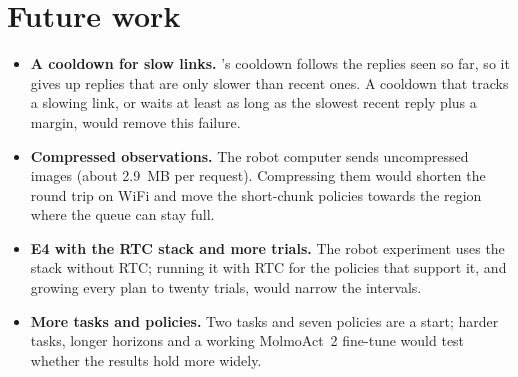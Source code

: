 \section{Future work}
\begin{itemize}
\item \textbf{A cooldown for slow links.} \drtc's cooldown follows the replies seen so far, so it gives up replies that
      are only slower than recent ones. A cooldown that tracks a slowing link, or waits at least as long as the slowest
      recent reply plus a margin, would remove this failure.
\item \textbf{Compressed observations.} The robot computer sends uncompressed images (about 2.9~MB per request).
      Compressing them would shorten the round trip on WiFi and move the short-chunk policies towards the region where
      the queue can stay full.
\item \textbf{E4 with the RTC stack and more trials.} The robot experiment uses the stack without RTC; running it with
      RTC for the policies that support it, and growing every plan to twenty trials, would narrow the intervals.
\item \textbf{More tasks and policies.} Two tasks and seven policies are a start; harder tasks, longer horizons and a
      working MolmoAct~2 fine-tune would test whether the results hold more widely.
\end{itemize}
